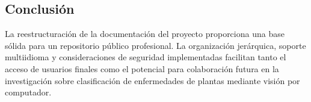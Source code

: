 \documentclass[12pt,a4paper]{article}
\begin{document}
\subsection{Conclusión}

La reestructuración de la documentación del proyecto proporciona una base sólida para un repositorio público profesional. La organización jerárquica, soporte multiidioma y consideraciones de seguridad implementadas facilitan tanto el acceso de usuarios finales como el potencial para colaboración futura en la investigación sobre clasificación de enfermedades de plantas mediante visión por computador.
\end{document}
